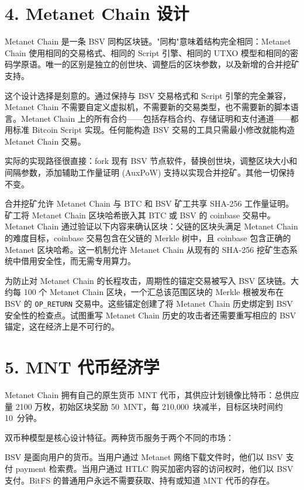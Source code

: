 \documentclass[11pt,a4paper]{article}
\begin{document}
\section{4. Metanet Chain 设计}

Metanet Chain 是一条 BSV 同构区块链。"同构"意味着结构完全相同：Metanet Chain 使用相同的交易格式、相同的 Script 引擎、相同的 UTXO 模型和相同的密码学原语。唯一的区别是独立的创世块、调整后的区块参数，以及新增的合并挖矿支持。

这个设计选择是刻意的。通过保持与 BSV 交易格式和 Script 引擎的完全兼容，Metanet Chain 不需要自定义虚拟机，不需要新的交易类型，也不需要新的脚本语言。Metanet Chain 上的所有合约——包括存档合约、存储证明和支付通道——都用标准 Bitcoin Script 实现。任何能构造 BSV 交易的工具只需最小修改就能构造 Metanet Chain 交易。

实际的实现路径很直接：fork 现有 BSV 节点软件，替换创世块，调整区块大小和间隔参数，添加辅助工作量证明 (AuxPoW) 支持以实现合并挖矿。其他一切保持不变。

合并挖矿允许 Metanet Chain 与 BTC 和 BSV 矿工共享 SHA-256 工作量证明。矿工将 Metanet Chain 区块哈希嵌入其 BTC 或 BSV 的 coinbase 交易中。Metanet Chain 通过验证以下内容来确认区块：父链的区块头满足 Metanet Chain 的难度目标，coinbase 交易包含在父链的 Merkle 树中，且 coinbase 包含正确的 Metanet 区块哈希。这一机制允许 Metanet Chain 从现有的 SHA-256 挖矿生态系统中借用安全性，而无需专用算力。

为防止对 Metanet Chain 的长程攻击，周期性的锚定交易被写入 BSV 区块链。大约每 100 个 Metanet Chain 区块，一个汇总该范围区块的 Merkle 根被发布在 BSV 的 \texttt{OP\_RETURN} 交易中。这些锚定创建了将 Metanet Chain 历史绑定到 BSV 安全性的检查点。试图重写 Metanet Chain 历史的攻击者还需要重写相应的 BSV 锚定，这在经济上是不可行的。

\section{5. MNT 代币经济学}

Metanet Chain 拥有自己的原生货币 MNT 代币，其供应计划镜像比特币：总供应量 2100 万枚，初始区块奖励 50~MNT，每 210,000~块减半，目标区块时间约 10~分钟。

双币种模型是核心设计特征。两种货币服务于两个不同的市场：

BSV 是面向用户的货币。当用户通过 Metanet 网络下载文件时，他们以 BSV 支付 payment 检索费。当用户通过 HTLC 购买加密内容的访问权时，他们以 BSV 支付。BitFS 的普通用户永远不需要获取、持有或知道 MNT 代币的存在。
\end{document}
